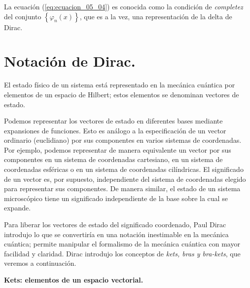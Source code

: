 La ecuación (\ref{eq:ecuacion_05_04}) es conocida como la condición de \emph{completez} del conjunto $\left\{ \varphi_{n} (x) \right\}$, que es a la vez, una representación de la delta de Dirac.
\par
\newpage
\section{Notación de Dirac.}
El estado físico de un sistema está representado en la mecánica cuántica por elementos de un espacio de Hilbert; estos elementos se denominan vectores de estado. 
\par
Podemos representar los vectores de estado en diferentes bases mediante expansiones de funciones. Esto es análogo a la especificación de un vector ordinario (euclidiano) por sus componentes en varios sistemas de coordenadas. Por ejemplo, podemos representar de manera equivalente un vector por sus componentes en un sistema de coordenadas cartesiano, en un sistema de coordenadas esféricas o en un sistema de coordenadas cilíndricas. El significado de un vector es, por supuesto, independiente del sistema de coordenadas elegido para representar sus componentes. De manera similar, el estado de un sistema microscópico tiene un significado independiente de la base sobre la cual se expande.
\par
Para liberar los vectores de estado del significado coordenado, Paul Dirac introdujo lo que se convertiría en una notación inestimable en la mecánica cuántica; permite manipular el formalismo de la mecánica cuántica con mayor facilidad y claridad. Dirac introdujo los conceptos de \emph{kets, bras y bra-kets}, que veremos a continuación.
\par
\textbf{Kets: elementos de un espacio vectorial.}

